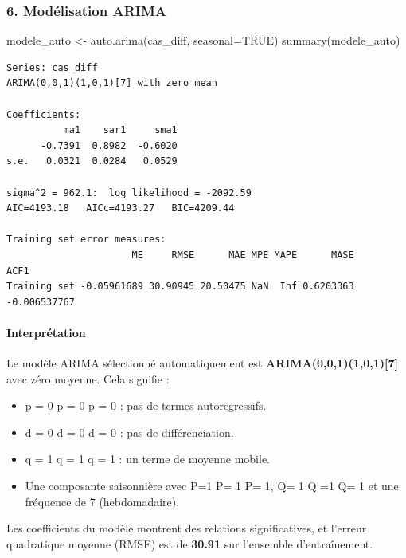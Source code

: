 \documentclass[
  letterpaper,
  DIV=11,
  numbers=noendperiod]{scrartcl}
\let\oldparagraph\paragraph
\renewcommand{\paragraph}[1]{\oldparagraph{#1}\mbox{}}
\newenvironment{Shaded}{\begin{snugshade}}{\end{snugshade}}
\newcommand{\AttributeTok}[1]{\textcolor[rgb]{0.40,0.45,0.13}{#1}}
\newcommand{\ConstantTok}[1]{\textcolor[rgb]{0.56,0.35,0.01}{#1}}
\newcommand{\FunctionTok}[1]{\textcolor[rgb]{0.28,0.35,0.67}{#1}}
\newcommand{\NormalTok}[1]{\textcolor[rgb]{0.00,0.23,0.31}{#1}}
\newcommand{\OtherTok}[1]{\textcolor[rgb]{0.00,0.23,0.31}{#1}}
\begin{document}
\subsubsection{6. Modélisation ARIMA}\label{moduxe9lisation-arima}

\begin{Shaded}
\begin{Highlighting}[]
\NormalTok{modele\_auto }\OtherTok{\textless{}{-}} \FunctionTok{auto.arima}\NormalTok{(cas\_diff, }\AttributeTok{seasonal=}\ConstantTok{TRUE}\NormalTok{)}
\FunctionTok{summary}\NormalTok{(modele\_auto)}
\end{Highlighting}
\end{Shaded}

\begin{verbatim}
Series: cas_diff 
ARIMA(0,0,1)(1,0,1)[7] with zero mean 

Coefficients:
          ma1    sar1     sma1
      -0.7391  0.8982  -0.6020
s.e.   0.0321  0.0284   0.0529

sigma^2 = 962.1:  log likelihood = -2092.59
AIC=4193.18   AICc=4193.27   BIC=4209.44

Training set error measures:
                      ME     RMSE      MAE MPE MAPE      MASE         ACF1
Training set -0.05961689 30.90945 20.50475 NaN  Inf 0.6203363 -0.006537767
\end{verbatim}

\paragraph{Interprétation}\label{interpruxe9tation-4}

Le modèle ARIMA sélectionné automatiquement est
\textbf{ARIMA(0,0,1)(1,0,1){[}7{]}} avec zéro moyenne. Cela signifie :

\begin{itemize}
\item
  p = 0 p = 0 p = 0 : pas de termes autoregressifs.
\item
  d = 0 d = 0 d = 0 : pas de différenciation.
\item
  q = 1 q = 1 q = 1 : un terme de moyenne mobile.
\item
  Une composante saisonnière avec P=1 P= 1 P= 1, Q= 1 Q =1 Q= 1 et une
  fréquence de 7 (hebdomadaire).
\end{itemize}

Les coefficients du modèle montrent des relations significatives, et
l'erreur quadratique moyenne (RMSE) est de \textbf{30.91} sur l'ensemble
d'entraînement.
\end{document}
